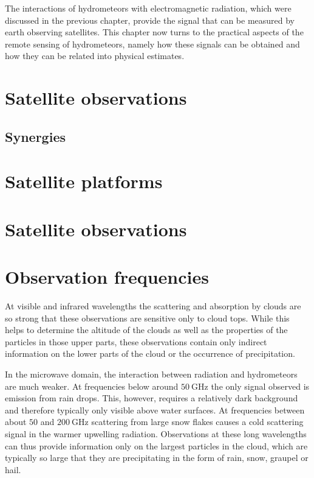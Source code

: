 
The interactions of hydrometeors with electromagnetic radiation, which were
discussed in the previous chapter, provide the signal that can be measured
by earth observing satellites. This chapter now turns to the practical
aspects of the remote sensing of hydrometeors, namely how these signals
can be obtained and how they can be related into physical estimates.

\section{Satellite observations}



\subsection{Synergies}

\section{Satellite platforms}

\section{Satellite observations}


\section{Observation frequencies}

At visible and infrared wavelengths the scattering and absorption by clouds are
so strong that these observations are sensitive only to cloud tops. While this
helps to determine the altitude of the clouds as well as the properties of the
particles in those upper parts, these observations contain only indirect
information on the lower parts of the cloud or the occurrence of precipitation.

In the microwave domain, the interaction between radiation and hydrometeors are
much weaker. At frequencies below around $\SI{50}{\giga \hertz}$ the only signal
observed is emission from rain drops. This, however, requires a relatively dark
background and therefore typically only visible above water surfaces. At
frequencies between about $50$ and $\SI{200}{\giga \hertz}$ scattering from large
snow flakes causes a cold scattering signal in the warmer upwelling radiation.
Observations at these long wavelengths can thus provide information only on the
largest particles in the cloud, which are typically so large that they are
precipitating in the form of rain, snow, graupel or hail.


